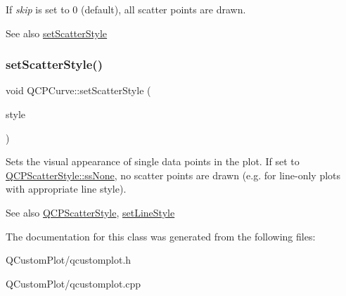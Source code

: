 If {\itshape skip} is set to 0 (default), all scatter points are drawn.

\begin{DoxySeeAlso}{See also}
\mbox{\hyperlink{class_q_c_p_curve_a55e43b44709bf50a35500644988aa706}{set\+Scatter\+Style}} 
\end{DoxySeeAlso}
\mbox{\label{class_q_c_p_curve_a55e43b44709bf50a35500644988aa706}} 
\subsubsection{\texorpdfstring{set\+Scatter\+Style()}{setScatterStyle()}}
{\footnotesize\ttfamily void Q\+C\+P\+Curve\+::set\+Scatter\+Style (\begin{DoxyParamCaption}\item[{const \mbox{\hyperlink{class_q_c_p_scatter_style}{Q\+C\+P\+Scatter\+Style}} \&}]{style }\end{DoxyParamCaption})}

Sets the visual appearance of single data points in the plot. If set to \mbox{\hyperlink{class_q_c_p_scatter_style_adb31525af6b680e6f1b7472e43859349abd144c291ca274f77053ec68cab6c022}{Q\+C\+P\+Scatter\+Style\+::ss\+None}}, no scatter points are drawn (e.\+g. for line-\/only plots with appropriate line style).

\begin{DoxySeeAlso}{See also}
\mbox{\hyperlink{class_q_c_p_scatter_style}{Q\+C\+P\+Scatter\+Style}}, \mbox{\hyperlink{class_q_c_p_curve_a4a377ec863ff81a1875c3094a6177c19}{set\+Line\+Style}} 
\end{DoxySeeAlso}


The documentation for this class was generated from the following files\+:\begin{DoxyCompactItemize}
\item 
Q\+Custom\+Plot/qcustomplot.\+h\item 
Q\+Custom\+Plot/qcustomplot.\+cpp\end{DoxyCompactItemize}
